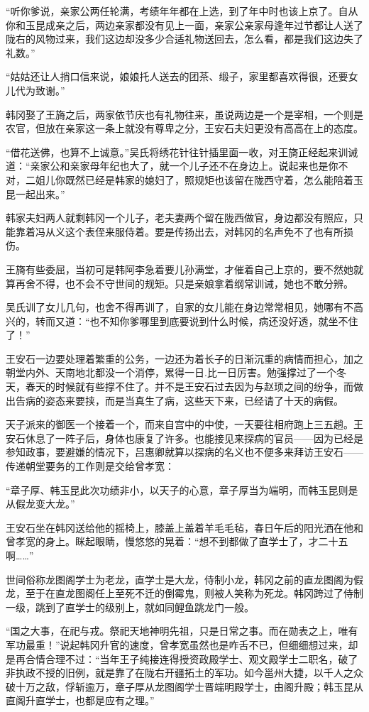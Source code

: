 “听你爹说，亲家公两任轮满，考绩年年都在上选，到了年中时也该上京了。自从你和玉昆成亲之后，两边亲家都没有见上一面，亲家公亲家母逢年过节都让人送了陇右的风物过来，我们这边却没多少合适礼物送回去，怎么看，都是我们这边失了礼数。”

“姑姑还让人捎口信来说，娘娘托人送去的团茶、缎子，家里都喜欢得很，还要女儿代为致谢。”

韩冈娶了王旖之后，两家依节庆也有礼物往来，虽说两边是一个是宰相，一个则是农官，但放在亲家这一条上就没有尊卑之分，王安石夫妇更没有高高在上的态度。

“借花送佛，也算不上诚意。”吴氏将绣花针往针插里面一收，对王旖正经起来训诫道：“亲家公和亲家母年纪也大了，就一个儿子还不在身边上。说起来也是你不对，二姐儿你既然已经是韩家的媳妇了，照规矩也该留在陇西守着，怎么能陪着玉昆一起出来。”

韩家夫妇两人就剩韩冈一个儿子，老夫妻两个留在陇西做官，身边都没有照应，只能靠着冯从义这个表侄来服侍着。要是传扬出去，对韩冈的名声免不了也有所损伤。

王旖有些委屈，当初可是韩阿李急着要儿孙满堂，才催着自己上京的，要不然她就算再舍不得，也不会不守世间的规矩。只是亲娘拿着纲常训诫，她也不敢分辨。

吴氏训了女儿几句，也舍不得再训了，自家的女儿能在身边常常相见，她哪有不高兴的，转而又道：“也不知你爹哪里到底要说到什么时候，病还没好透，就坐不住了！”

王安石一边要处理着繁重的公务，一边还为着长子的日渐沉重的病情而担心，加之朝堂内外、天南地北都没一个消停，累得一日.比一日厉害。勉强撑过了一个冬天，春天的时候就有些撑不住了。并不是王安石过去因为与赵顼之间的纷争，而做出告病的姿态来要挟，而是当真生了病，这些天下来，已经请了十天的病假。

天子派来的御医一个接着一个，而来自宫中的中使，一天要往相府跑上三五趟。王安石休息了一阵子后，身体也康复了许多。也能接见来探病的官员——因为已经是参知政事，要避嫌的情况下，吕惠卿就算以探病的名义也不便多来拜访王安石——传递朝堂要务的工作则是交给曾孝宽：

“章子厚、韩玉昆此次功绩非小，以天子的心意，章子厚当为端明，而韩玉昆则是从假龙变大龙。”

王安石坐在韩冈送给他的摇椅上，膝盖上盖着羊毛毛毡，春日午后的阳光洒在他和曾孝宽的身上。眯起眼睛，慢悠悠的晃着：“想不到都做了直学士了，才二十五啊……”

世间俗称龙图阁学士为老龙，直学士是大龙，侍制小龙，韩冈之前的直龙图阁为假龙，至于在直龙图阁任上至死不迁的倒霉鬼，则被人笑称为死龙。韩冈跨过了侍制一级，跳到了直学士的级别上，就如同鲤鱼跳龙门一般。

“国之大事，在祀与戎。祭祀天地神明先祖，只是日常之事。而在勋表之上，唯有军功最重！”说起韩冈升官的速度，曾孝宽虽然也是咋舌不已，但细细想过来，却是再合情合理不过：“当年王子纯接连得授资政殿学士、观文殿学士二职名，破了非执政不授的旧例，就是靠了在陇右开疆拓土的军功。如今邕州大捷，以千人之众破十万之敌，俘斩逾万，章子厚从龙图阁学士晋端明殿学士，由阁升殿；韩玉昆从直阁升直学士，也都是应有之理。”

